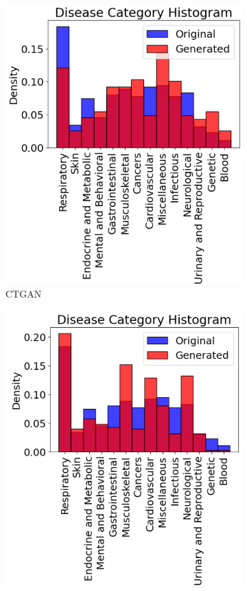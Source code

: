 \begin{figure}[H]
    \centering
    \begin{subfigure}[b]{0.45\textwidth}
        \centering
        \includegraphics[width=\textwidth]{images/disease_ctgan.png}
        \caption{CTGAN}
        \label{fig:disease_ctgan}
    \end{subfigure}
    \hfill
    \begin{subfigure}[b]{0.45\textwidth}
        \centering
        \includegraphics[width=\textwidth]{images/disease_begreat.png}

\end{subfigure}
\end{figure}
